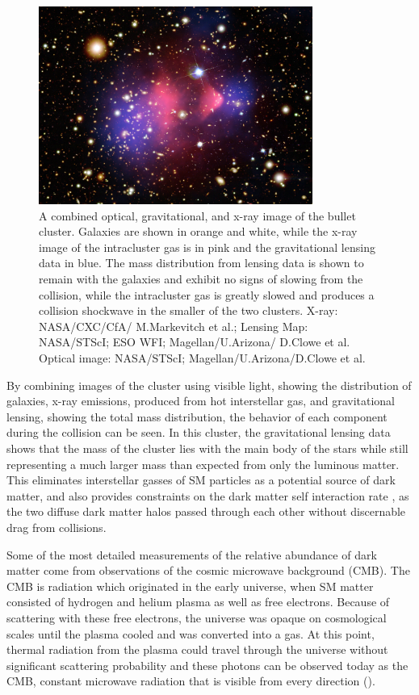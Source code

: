 \begin{figure}[htpb]
	\label{fig:bullet}
	\centering
	\includegraphics[width=0.8\textwidth]{figures/bullet_cluster.jpg}
	\caption[Visible, x-ray, and gravitational lensing images of the bullet cluster]{ A combined optical, gravitational, and x-ray image of the bullet cluster. Galaxies are shown in orange and white, while the x-ray image of the intracluster gas is in pink and the gravitational lensing data in blue. The mass distribution from lensing data is shown to remain with the galaxies and exhibit no signs of slowing from the collision, while the intracluster gas is greatly slowed and produces a collision shockwave in the smaller of the two clusters. X-ray: NASA/CXC/CfA/ M.Markevitch et al.; Lensing Map: NASA/STScI; ESO WFI; Magellan/U.Arizona/ D.Clowe et al. Optical image: NASA/STScI; Magellan/U.Arizona/D.Clowe et al.}
\end{figure}

By combining images of the cluster using visible light, showing the distribution of galaxies, x-ray emissions, produced from hot interstellar gas, and gravitational lensing, showing the total mass distribution, the behavior of each component during the collision can be seen. 
In this cluster, the gravitational lensing data shows that the mass of the cluster lies with the main body of the stars while still representing a much larger mass than expected from only the luminous matter. 
This eliminates interstellar gasses of SM particles as a potential source of dark matter, and also provides constraints on the dark matter self interaction rate \cite{Randall_2008}, as the two diffuse dark matter halos passed through each other without discernable drag from collisions.

Some of the most detailed measurements of the relative abundance of dark matter come from observations of the cosmic microwave background (CMB).
The CMB is radiation which originated in the early universe, when SM matter consisted of hydrogen and helium plasma as well as free electrons.
Because of scattering with these free electrons, the universe was opaque on cosmological scales until the plasma cooled and was converted into a gas. 
At this point, thermal radiation from the plasma could travel through the universe without significant scattering probability and these photons can be observed today as the CMB, constant microwave radiation that is visible from every direction ().

